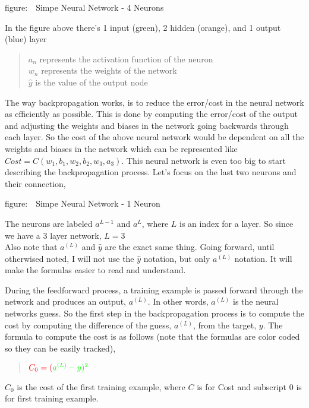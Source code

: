 \documentclass[11pt]{article}
\begin{document}
figure:~~Simpe Neural Network - 4 Neurons

In the figure above there's 1 input (green), 2 hidden (orange), and 1
output (blue) layer

\begin{quote}
\(a_n\) represents the activation function of the neuron\\
\(w_n\) represents the weights of the network\\
\(\hat{y}\) is the value of the output node
\end{quote}

The way backpropagation works, is to reduce the error/cost in the neural
network as efficiently as possible. This is done by computing the
error/cost of the output and adjusting the weights and biases in the
network going backwards through each layer. So the cost of the above
neural network would be dependent on all the weights and biases in the
network which can be represented like
\(Cost = C(w_1, b_1, w_2, b_2, w_3, a_3)\). This neural network is even
too big to start describing the backpropagation process. Let's focus on
the last two neurons and their connection,

figure:~~Simpe Neural Network - 1 Neuron

The neurons are labeled \(a^{L-1}\) and \(a^{L}\), where \(L\) is an
index for a layer. So since we have a 3 layer network, \(L = 3\)\\
Also note that \(a^{(L)}\) and \(\hat{y}\) are the exact same thing.
Going forward, until otherwised noted, I will not use the \(\hat{y}\)
notation, but only \(a^{(L)}\) notation. It will make the formulas
easier to read and understand.

During the feedforward process, a training example is passed forward
through the network and produces an output, \(a^{(L)}\). In other words,
\(a^{(L)}\) is the neural networks guess. So the first step in the
backpropagation process is to compute the cost by computing the
difference of the guess, \(a^{(L)}\), from the target, \(y\). The
formula to compute the cost is as follows (note that the formulas are
color coded so they can be easily tracked),

\begin{quote}
\(\color{red}{ C_0 = (\color{green}{ a^{(L)} } - y)^{2} }\)
\end{quote}

\(C_0\) is the cost of the first training example, where \(C\) is for
Cost and subscript 0 is for first training example.
\end{document}
